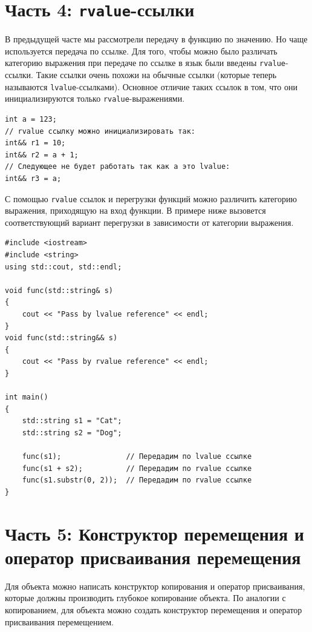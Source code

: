 \documentclass{article}
\begin{document}
\newpage
\section*{Часть 4: \texttt{rvalue}-ссылки}
В предыдущей часте мы рассмотрели передачу в функцию по значению. Но чаще используется передача по ссылке. Для того, чтобы можно было различать категорию выражения при передаче по ссылке в язык были введены \texttt{rvalue}-ссылки. Такие ссылки очень похожи на обычные ссылки (которые теперь называются \texttt{lvalue}-ссылками). Основное отличие таких ссылок в том, что они инициализируются только \texttt{rvalue}-выражениями.

\begin{lstlisting}
int a = 123;
// rvalue ссылку можно инициализировать так:
int&& r1 = 10;
int&& r2 = a + 1;
// Следующее не будет работать так как a это lvalue:
int&& r3 = a; 
\end{lstlisting}


С помощью \texttt{rvalue} ссылок и перегрузки функций можно различить категорию выражения, приходящую на вход функции. В примере ниже вызовется соответствующий вариант перегрузки в зависимости от категории выражения.
\begin{lstlisting}
#include <iostream>
#include <string>
using std::cout, std::endl;

void func(std::string& s)
{
    cout << "Pass by lvalue reference" << endl;
}
void func(std::string&& s)
{
    cout << "Pass by rvalue reference" << endl;
}

int main() 
{
    std::string s1 = "Cat";
    std::string s2 = "Dog";

    func(s1);               // Передадим по lvalue ссылке
    func(s1 + s2);          // Передадим по rvalue ссылке
    func(s1.substr(0, 2));  // Передадим по rvalue ссылке
}
\end{lstlisting}

\newpage
\section*{Часть 5: Конструктор перемещения и оператор присваивания перемещения}
Для объекта можно написать конструктор копирования и оператор присваивания, которые должны производить глубокое копирование объекта. По аналогии с копированием, для объекта можно создать конструктор перемещения и оператор присваивания перемещением.

\newpage
\end{document}
